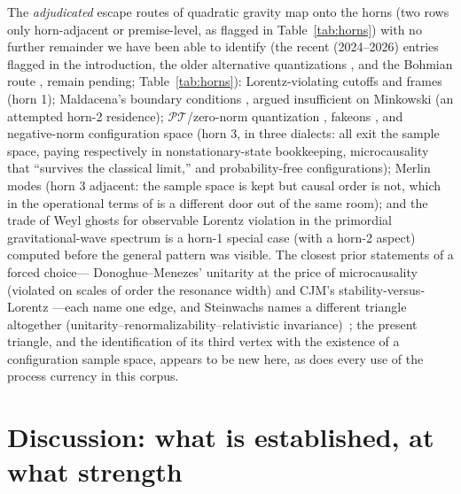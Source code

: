\documentclass[11pt]{article}
\theoremstyle{definition}
\theoremstyle{remark}
\newcommand{\PT}{\mathcal{PT}}
\begin{document}
The \emph{adjudicated} escape routes of quadratic gravity map onto the horns
(two rows only horn-adjacent or premise-level, as flagged in Table~\ref{tab:horns})
with no further remainder we have been able to identify (the recent (2024--2026) entries
flagged in the introduction, the older alternative quantizations \cite{Mostafazadeh2011,IlhanKovner2014}, and the Bohmian route \cite{DeyFring2026}, remain pending;
Table~\ref{tab:horns}): Lorentz-violating cutoffs and frames
\cite{CJM2004,Konnig2016} (horn 1); Maldacena's boundary conditions
\cite{Maldacena2011}, argued insufficient on Minkowski
\cite{HellLustZoupanos2023} (an attempted horn-2 residence);
$\PT$/zero-norm quantization \cite{BenderMannheim2008,Mannheim2020},
fakeons \cite{Anselmi2018}, and negative-norm configuration space
\cite{SalvioStrumia2016} (horn 3, in three dialects: all exit the
sample space, paying respectively in nonstationary-state bookkeeping,
microcausality that ``survives the classical limit,'' and
probability-free configurations); Merlin modes
\cite{DonoghueMenezes} (horn 3 adjacent: the sample space is kept
but causal order is not, which in the operational terms of
\cite{instantaneous} is a different door out of the same room);
and the trade of Weyl ghosts for observable Lorentz violation in the
primordial gravitational-wave spectrum \cite{Deruelle2012} is a
horn-1 special case (with a horn-2 aspect) computed before the general pattern was
visible. The closest prior statements of a forced choice---%
Donoghue--Menezes' unitarity at the price of microcausality
(violated on scales of order the resonance
width) \cite{DonoghueMenezes} and CJM's stability-versus-Lorentz
\cite{CJM2004}---each name one edge, and Steinwachs names a
different triangle altogether
(unitarity--renormalizability--relativistic
invariance)~\cite{Steinwachs2020}; the present triangle, and the
identification of its third vertex with the existence of a
configuration sample space, appears to be new here, as does every
use of the process currency in this corpus.

\section{Discussion: what is established, at what strength}
\label{sec:discussion}
\end{document}
